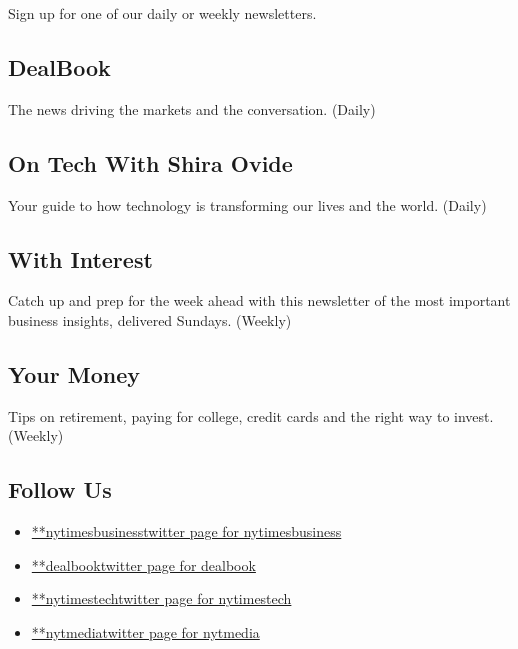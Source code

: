 Sign up for one of our daily or weekly newsletters.

\hypertarget{dealbook}{%
\subsection{DealBook}\label{dealbook}}

The news driving the markets and the conversation. (Daily)

\hypertarget{on-tech-with-shira-ovide}{%
\subsection{On Tech With Shira Ovide}\label{on-tech-with-shira-ovide}}

Your guide to how technology is transforming our lives and the world.
(Daily)

\hypertarget{with-interest}{%
\subsection{With Interest}\label{with-interest}}

Catch up and prep for the week ahead with this newsletter of the most
important business insights, delivered Sundays. (Weekly)

\hypertarget{your-money}{%
\subsection{Your Money}\label{your-money}}

Tips on retirement, paying for college, credit cards and the right way
to invest. (Weekly)

\hypertarget{follow-us}{%
\subsection{Follow Us}\label{follow-us}}

\begin{itemize}
\tightlist
\item
  \href{https://twitter.com/nytimesbusiness}{**nytimesbusinesstwitter
  page for nytimesbusiness}
\item
  \href{https://twitter.com/dealbook}{**dealbooktwitter page for
  dealbook}
\item
  \href{https://twitter.com/nytimestech}{**nytimestechtwitter page for
  nytimestech}
\item
  \href{https://twitter.com/nytmedia}{**nytmediatwitter page for
  nytmedia}
\end{itemize}

